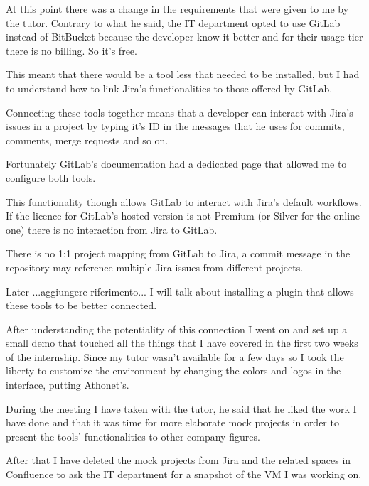 	At this point there was a change in the requirements that were given to me by the tutor.
	Contrary to what he said, the IT department opted to use GitLab instead of BitBucket because the developer know it better and for their usage tier there is no billing.
	So it's free.
	
	This meant that there would be a tool less that needed to be installed, but I had to understand how to link Jira's functionalities to those offered by GitLab.
	
	Connecting these tools together means that a developer can interact with Jira's issues in a project by typing it's ID in the messages that he uses for commits, comments, merge requests and so on.
	
	Fortunately GitLab's documentation had a dedicated page that allowed me to configure both tools.
	
	
	This functionality though allows GitLab to interact with Jira's default workflows.	
	If the licence for GitLab's hosted version is not Premium (or Silver for the online one) there is no interaction from Jira to GitLab.
	
	
	There is no 1:1 project mapping from GitLab to Jira, a commit message in the repository may reference multiple Jira issues from different projects.
	
	Later ...aggiungere riferimento... I will talk about installing a plugin that allows these tools to be better connected.
	
	After understanding the potentiality of this connection I went on and set up a small demo that touched all the things that I have covered in the first two weeks of the internship.
	Since my tutor wasn't available for a few days so I took the liberty to customize the environment by changing the colors and logos in the interface, putting Athonet's.
	
	
	During the meeting I have taken with the tutor, he said that he liked the work I have done and that it was time for more elaborate mock projects in order to present the tools' functionalities to other company figures.
	
	After that I have deleted the mock projects from Jira and the related spaces in Confluence to ask the IT department for a snapshot of the VM I was working on.
	
